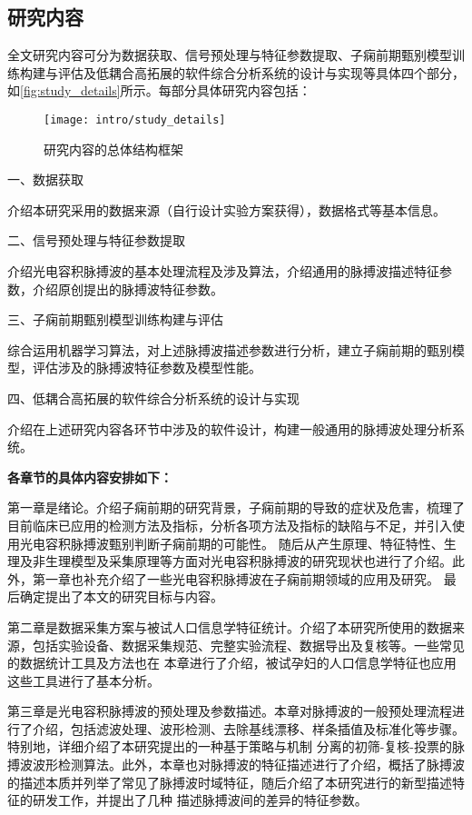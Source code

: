 \subsection{研究内容}
全文研究内容可分为数据获取、信号预处理与特征参数提取、子痫前期甄别模型训练构建与评估及低耦合高拓展的软件综合分析系统的设计与实现等具体四个部分，如\autoref{fig:study_details}所示。每部分具体研究内容包括：
\begin{figure}[htbp]
    \centering
    \texttt{[image: intro/study\_details]}
    \caption{\label{fig:study_details}研究内容的总体结构框架}
\end{figure}

一、数据获取

介绍本研究采用的数据来源（自行设计实验方案获得），数据格式等基本信息。

二、信号预处理与特征参数提取

介绍光电容积脉搏波的基本处理流程及涉及算法，介绍通用的脉搏波描述特征参数，介绍原创提出的脉搏波特征参数。

三、子痫前期甄别模型训练构建与评估

综合运用机器学习算法，对上述脉搏波描述参数进行分析，建立子痫前期的甄别模型，评估涉及的脉搏波特征参数及模型性能。

四、低耦合高拓展的软件综合分析系统的设计与实现

介绍在上述研究内容各环节中涉及的软件设计，构建一般通用的脉搏波处理分析系统。

\textbf{各章节的具体内容安排如下：}

第一章是绪论。介绍子痫前期的研究背景，子痫前期的导致的症状及危害，梳理了目前临床已应用的检测方法及指标，分析各项方法及指标的缺陷与不足，并引入使用光电容积脉搏波甄别判断子痫前期的可能性。
随后从产生原理、特征特性、生理及非生理模型及采集原理等方面对光电容积脉搏波的研究现状也进行了介绍。此外，第一章也补充介绍了一些光电容积脉搏波在子痫前期领域的应用及研究。
最后确定提出了本文的研究目标与内容。

第二章是数据采集方案与被试人口信息学特征统计。介绍了本研究所使用的数据来源，包括实验设备、数据采集规范、完整实验流程、数据导出及复核等。一些常见的数据统计工具及方法也在
本章进行了介绍，被试孕妇的人口信息学特征也应用这些工具进行了基本分析。

第三章是光电容积脉搏波的预处理及参数描述。本章对脉搏波的一般预处理流程进行了介绍，包括滤波处理、波形检测、去除基线漂移、样条插值及标准化等步骤。特别地，详细介绍了本研究提出的一种基于策略与机制
分离的初筛-复核-投票的脉搏波波形检测算法。此外，本章也对脉搏波的特征描述进行了介绍，概括了脉搏波的描述本质并列举了常见了脉搏波时域特征，随后介绍了本研究进行的新型描述特征的研发工作，并提出了几种
描述脉搏波间的差异的特征参数。

